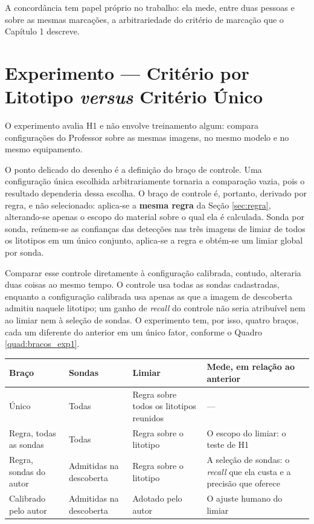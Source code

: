 A concordância tem papel próprio no trabalho: ela mede, entre duas pessoas e sobre as mesmas marcações, a arbitrariedade do critério de marcação que o Capítulo 1 descreve.

\section{Experimento --- Critério por Litotipo \textit{versus} Critério Único}
\label{sec:exp1}

O experimento avalia H1 e não envolve treinamento algum: compara configurações do Professor sobre as mesmas imagens, no mesmo modelo e no mesmo equipamento.

O ponto delicado do desenho é a definição do braço de controle. Uma configuração única escolhida arbitrariamente tornaria a comparação vazia, pois o resultado dependeria dessa escolha. O braço de controle é, portanto, derivado por regra, e não selecionado: aplica-se a \textbf{mesma regra} da Seção \ref{sec:regra}, alterando-se apenas o escopo do material sobre o qual ela é calculada. Sonda por sonda, reúnem-se as confianças das detecções nas três imagens de limiar de todos os litotipos em um único conjunto, aplica-se a regra e obtém-se um limiar global por sonda.

Comparar esse controle diretamente à configuração calibrada, contudo, alteraria duas coisas ao mesmo tempo. O controle usa todas as sondas cadastradas, enquanto a configuração calibrada usa apenas as que a imagem de descoberta admitiu naquele litotipo; um ganho de \textit{recall} do controle não seria atribuível nem ao limiar nem à seleção de sondas. O experimento tem, por isso, quatro braços, cada um diferente do anterior em um único fator, conforme o Quadro \ref{quad:bracos_exp1}.

\begin{quadro}[ht]
  \caption{Braços do experimento. Cada braço difere do anterior em um único fator.}
  \label{quad:bracos_exp1}
  \centering
  \begin{tabularx}{\textwidth}{>{\raggedright\arraybackslash}p{3.0cm}>{\raggedright\arraybackslash}p{2.6cm}>{\raggedright\arraybackslash}p{3.6cm}>{\raggedright\arraybackslash}X}
    \hline
    \bfseries Braço & \bfseries Sondas & \bfseries Limiar & \bfseries Mede, em relação ao anterior \\
    \hline
    Único                  & Todas                    & Regra sobre todos os litotipos reunidos & --- \\
    Regra, todas as sondas & Todas                    & Regra sobre o litotipo                  & O escopo do limiar: o teste de H1 \\
    Regra, sondas do autor & Admitidas na descoberta  & Regra sobre o litotipo                  & A seleção de sondas: o \textit{recall} que ela custa e a precisão que oferece \\
    Calibrado pelo autor   & Admitidas na descoberta  & Adotado pelo autor                       & O ajuste humano do limiar \\
    \hline
  \end{tabularx}
\end{quadro}

